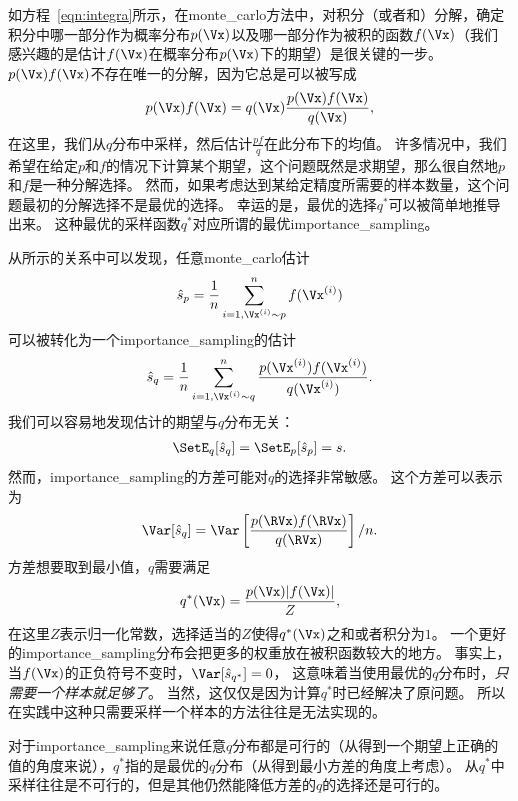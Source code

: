 如方程~\eqref{eqn:integra}所示，在\gls{monte_carlo}方法中，对积分（或者和）分解，确定积分中哪一部分作为概率分布$p(\Vx)$以及哪一部分作为被积的函数$f(\Vx)$（我们感兴趣的是估计$f(\Vx)$在概率分布$p(\Vx)$下的期望）是很关键的一步。  
$p(\Vx)f(\Vx)$不存在唯一的分解，因为它总是可以被写成   
\begin{align}
\label{eqn:decomposition}
p(\Vx)f(\Vx) = q(\Vx) \frac{p(\Vx)f(\Vx)}{q(\Vx)},
\end{align}
在这里，我们从$q$分布中采样，然后估计$\frac{pf}{q}$在此分布下的均值。
许多情况中，我们希望在给定$p$和$f$的情况下计算某个期望，这个问题既然是求期望，那么很自然地$p$和$f$是一种分解选择。 
然而，如果考虑达到某给定精度所需要的样本数量，这个问题最初的分解选择不是最优的选择。
幸运的是，最优的选择$q^*$可以被简单地推导出来。   
这种最优的采样函数$q^*$对应所谓的最优\gls{importance_sampling}。 


从所示的关系中可以发现，任意\gls{monte_carlo}估计   
\begin{align}
\hat{s}_p = \frac{1}{n}\sum_{i=1,\Vx^{(i)}\sim p}^{n}f(\Vx^{(i)})
\end{align}
可以被转化为一个\gls{importance_sampling}的估计
\begin{align}
\hat{s}_q = \frac{1}{n}\sum_{i=1,\Vx^{(i)}\sim q}^{n}\frac{p(\Vx^{(i)})f(\Vx^{(i)})}{q(\Vx^{(i)})}.
\end{align}
我们可以容易地发现估计的期望与$q$分布无关：   
\begin{align}
\SetE_q [\hat{s}_q] = \SetE_p [\hat{s}_p] = s.      
\end{align}
然而，\gls{importance_sampling}的方差可能对$q$的选择非常敏感。 
这个方差可以表示为
\begin{align}
\label{eqn:variance_of_is}
\Var [\hat{s}_q] = \Var \left[\frac{p(\RVx)f(\RVx)}{q(\RVx)}\right]/n.
\end{align}
方差想要取到最小值，$q$需要满足
\begin{align}
q^*(\Vx) = \frac{p(\Vx)\vert f(\Vx)\vert}{Z},
\end{align}
在这里$Z$表示归一化常数，选择适当的$Z$使得$q^*(\Vx)$之和或者积分为$1$。
一个更好的\gls{importance_sampling}分布会把更多的权重放在被积函数较大的地方。 
事实上，当$f(\Vx)$的正负符号不变时，$\Var[\hat{s}_{q^*}]=0$， 这意味着当使用最优的$q$分布时，\emph{只需要一个样本就足够了}。
当然，这仅仅是因为计算$q^*$时已经解决了原问题。   
所以在实践中这种只需要采样一个样本的方法往往是无法实现的。 


对于\gls{importance_sampling}来说任意$q$分布都是可行的（从得到一个期望上正确的值的角度来说），$q^*$指的是最优的$q$分布（从得到最小方差的角度上考虑）。
从$q^*$中采样往往是不可行的，但是其他仍然能降低方差的$q$的选择还是可行的。 



